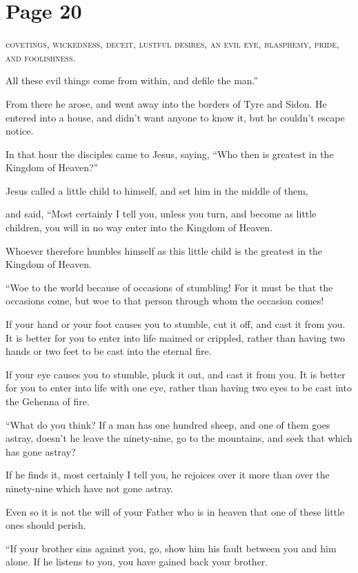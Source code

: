 \chapterornament
\section*{Page 20}

\lettrine{c}{ovetings, wickedness, deceit, lustful desires, an evil eye, blasphemy, pride, and foolishness.}

All these evil things come from within, and defile the man.”

From there he arose, and went away into the borders of Tyre and Sidon. He entered into a house, and didn’t want anyone to know it, but he couldn’t escape notice.

In that hour the disciples came to Jesus, saying, “Who then is greatest in the Kingdom of Heaven?”

Jesus called a little child to himself, and set him in the middle of them,

and said, “Most certainly I tell you, unless you turn, and become as little children, you will in no way enter into the Kingdom of Heaven.

Whoever therefore humbles himself as this little child is the greatest in the Kingdom of Heaven.

“Woe to the world because of occasions of stumbling! For it must be that the occasions come, but woe to that person through whom the occasion comes!

If your hand or your foot causes you to stumble, cut it off, and cast it from you. It is better for you to enter into life maimed or crippled, rather than having two hands or two feet to be cast into the eternal fire.

If your eye causes you to stumble, pluck it out, and cast it from you. It is better for you to enter into life with one eye, rather than having two eyes to be cast into the Gehenna of fire.

“What do you think? If a man has one hundred sheep, and one of them goes astray, doesn’t he leave the ninety-nine, go to the mountains, and seek that which has gone astray?

If he finds it, most certainly I tell you, he rejoices over it more than over the ninety-nine which have not gone astray.

Even so it is not the will of your Father who is in heaven that one of these little ones should perish.

“If your brother sins against you, go, show him his fault between you and him alone. If he listens to you, you have gained back your brother.

